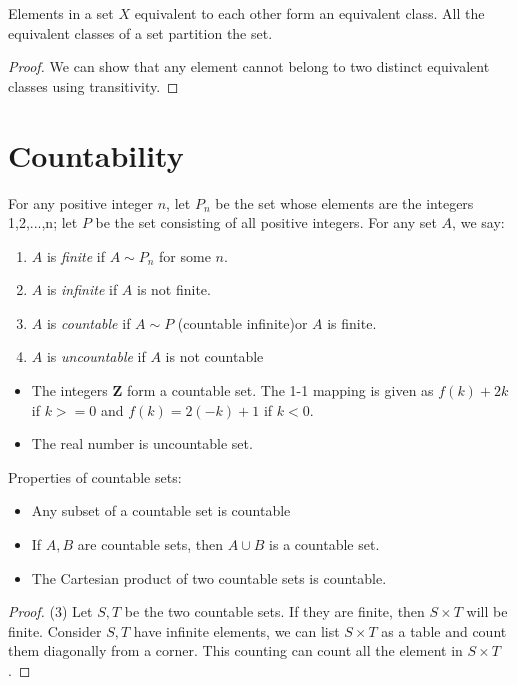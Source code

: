\begin{refsection}
\begin{theorem}
Elements in a set $X$ equivalent to each other form an equivalent class. All the equivalent classes of a set partition the set.  
\end{theorem}
\begin{proof}
We can show that any element cannot belong to two distinct equivalent classes using transitivity.	
\end{proof}
 

\section{Countability}
\begin{definition}\cite{johnsonbaugh2010foundations}
For any positive integer $n$, let $P_n$ be the set whose elements are the integers 1,2,...,n; let $P$ be the set consisting of all positive integers. For any set $A$, we say:
\begin{enumerate}
\item $A$ is \emph{finite} if $A \sim P_n$ for some $n$.
\item $A$ is \emph{infinite} if $A$ is not finite.
\item $A$ is \emph{countable} if $A \sim P$ (countable infinite)or $A$ is finite.
\item $A$ is \emph{uncountable} if $A$ is not countable
\end{enumerate}
\end{definition}


\begin{example}\hfill
\begin{itemize}
    \item The integers $\mathbf{Z}$ form a countable set. The 1-1 mapping is given as $f(k)+2k $ if $k >= 0 $ and $f(k) = 2(-k) + 1$ if $k < 0$.
    \item The real number is uncountable set. 
\end{itemize}
\end{example}



\begin{lemma}
\cite{johnsonbaugh2010foundations}Properties of countable sets:
\begin{itemize}
    \item Any subset of a countable set is countable
    \item If $A, B$ are countable sets, then $A\cup B$ is a countable set.
    \item The Cartesian product of two countable sets is countable.
\end{itemize}
\end{lemma}
\begin{proof}
(3)	Let $S,T$ be the two countable sets. If they are finite, then $S\times T$ will be finite. Consider $S,T$ have infinite elements, we can list $S\times T$ as a table and count them diagonally from a corner. This counting can count all the element in $S\times T$.
\end{proof}




\end{refsection}
